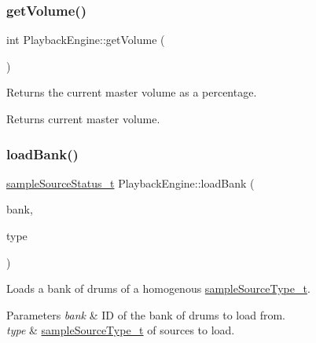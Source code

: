 \subsubsection{\texorpdfstring{get\+Volume()}{getVolume()}\hspace{0.1cm}{\footnotesize\ttfamily [2/2]}}
{\footnotesize\ttfamily int Playback\+Engine\+::get\+Volume (\begin{DoxyParamCaption}{ }\end{DoxyParamCaption})}

Returns the current master volume as a percentage. \begin{DoxyReturn}{Returns}
current master volume. 
\end{DoxyReturn}
\mbox{\label{classdrumpi_1_1audio_1_1PlaybackEngine_a3cf9336457c420b4d7a9f0e065743465}} 
\subsubsection{\texorpdfstring{load\+Bank()}{loadBank()}}
{\footnotesize\ttfamily \hyperlink{namespacedrumpi_1_1audio_a51bdf5757f414341f104d45e75e2bf63}{sample\+Source\+Status\+\_\+t} Playback\+Engine\+::load\+Bank (\begin{DoxyParamCaption}\item[{int}]{bank,  }\item[{\hyperlink{namespacedrumpi_1_1audio_a997f55e8a5b5348cf74dbedb7abe8a59}{sample\+Source\+Type\+\_\+t}}]{type }\end{DoxyParamCaption})}

Loads a bank of drums of a homogenous \hyperlink{namespacedrumpi_1_1audio_a997f55e8a5b5348cf74dbedb7abe8a59}{sample\+Source\+Type\+\_\+t}. 
\begin{DoxyParams}{Parameters}
{\em bank} & ID of the bank of drums to load from. \\
\hline
{\em type} & \hyperlink{namespacedrumpi_1_1audio_a997f55e8a5b5348cf74dbedb7abe8a59}{sample\+Source\+Type\+\_\+t} of sources to load. \\
\hline
\end{DoxyParams}
\mbox{\label{classdrumpi_1_1audio_1_1PlaybackEngine_a567803fa214f9c94abc4678e5013508c}} 
